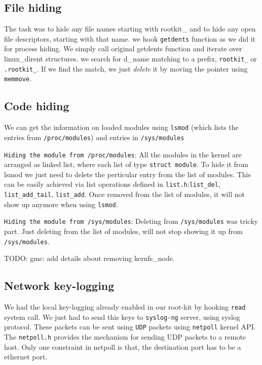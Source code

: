 \documentclass[10pt, letterpaper]{scrartcl}
\begin{document}
\subsection{File hiding}
The task was to hide any file names starting with rootkit\_ and to hide any open file descriptors, 
starting with that name. we hook \texttt{getdents} function as we did it for process hiding. 
We simply call original getdents function and iterate over linux\_dirent structures.
we search for d\_name matching to a prefix, \texttt{rootkit\_} or \texttt{.rootkit\_}. 
If we find the match, we just {\em delete} it by moving the pointer using \texttt{memmove}.


\subsection{Code hiding}
We can get the information on loaded modules using \texttt{lsmod}
(which lists the entries from \texttt{/proc/modules}) and entries in \texttt{/sys/modules}

\texttt{Hiding the module from /proc/modules}: All the modules in the kernel are arranged as linked list, 
where each list of type \texttt{struct module}. 
To hide it from lsmod we just need to delete the perticular entry from the list of modules. 
This can be easily achieved via list operations defined in \texttt{list.h}:\texttt{list\_del}, 
\texttt{list\_add\_tail}, \texttt{list\_add}. Once removed from the list of modules, 
it will not show up anymore when using \texttt{lsmod}. 

\texttt{Hiding the module from /sys/modules}: Deleting from \texttt{/sys/modules} was tricky part. 
Just deleting from the list of modules, 
will not stop showing it up from \texttt{/sys/modules}. 

TODO: gmc: add details about removing kernfs\_node. 

\subsection{Network key-logging}
We had the local key-logging already enabled in our root-kit by hooking \texttt{read} system call. 
We just had to send this keys to \texttt{syslog-ng} server, using syslog protocol. 
These packets can be sent using \texttt{UDP} packets using \texttt{netpoll} kernel API. 
The \texttt{netpoll.h} provides the mechanism for sending UDP packets to a remote host. 
Only one constraint in netpoll is that, the destination port has to be a ethernet port. 
\end{document}
